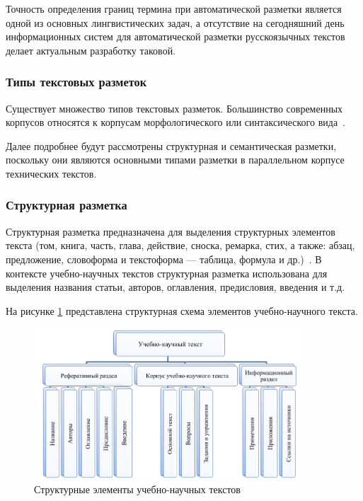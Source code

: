Точность определения границ термина при автоматической разметки является одной из основных лингвистических задач, а отсутствие на сегодняшний день информационных систем для автоматической разметки русскоязычных текстов делает актуальным разработку таковой.


\subsubsection*{Типы текстовых разметок}

Существует множество типов текстовых разметок.
Большинство современных корпусов относятся к корпусам морфологического или синтаксического вида~\cite[с. 56]{cl2020}.

Далее подробнее будут рассмотрены структурная и семантическая разметки, поскольку они являются основными типами разметки в параллельном корпусе технических текстов.

\newpage

\subsubsection*{Структурная разметка}

Структурная разметка предназначена для выделения структурных элементов текста (том, книга, часть, глава, действие, сноска, ремарка, стих, а также: абзац, предложение, словоформа и текстоформа --- таблица, формула и др.)~\cite{lesnikov2019}.
В контексте учебно-научных текстов структурная разметка использована для выделения названия статьи, авторов, оглавления, предисловия, введения и т.д.

На рисунке \ref{fig:ts} представлена структурная схема элементов учебно-научного текста. 

\begin{figure}[H]
	\centering
	\includegraphics[width=0.9\textwidth]{img/tagging-struct.png}
	\caption{Структурные элементы учебно-научных текстов~\cite{butenko2021}}
	\label{fig:ts}
\end{figure}

